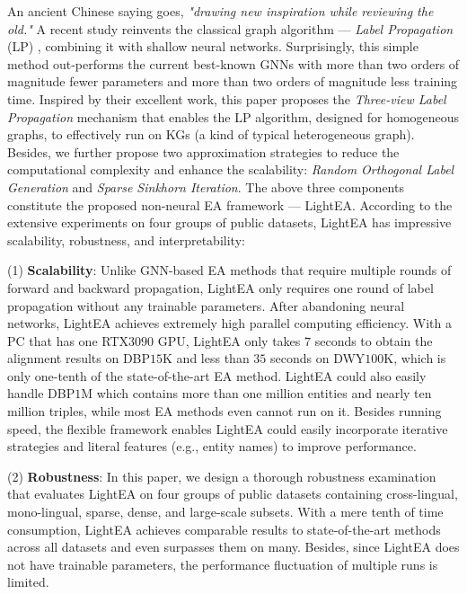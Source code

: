 \documentclass[11pt]{article}
\begin{document}
An ancient Chinese saying goes, \emph{"drawing new inspiration while reviewing the old."}
A recent study \cite{DBLP:conf/iclr/HuangHSLB21} reinvents the classical graph algorithm --- \emph{Label Propagation} (LP) \cite{Zhu2002LearningFL}, combining it with shallow neural networks.
Surprisingly, this simple method out-performs the current best-known GNNs with more than two orders of magnitude fewer parameters and more than two orders of magnitude less training time.
Inspired by their excellent work, this paper proposes the \emph{Three-view Label Propagation} mechanism that enables the LP algorithm, designed for homogeneous graphs, to effectively run on KGs (a kind of typical heterogeneous graph).
Besides, we further propose two approximation strategies to reduce the computational complexity and enhance the scalability:
\emph{Random Orthogonal Label Generation} and \emph{Sparse Sinkhorn Iteration}.
The above three components constitute the proposed non-neural EA framework --- LightEA.
According to the extensive experiments on four groups of public datasets, LightEA has impressive scalability, robustness, and interpretability:

(1) \textbf{Scalability}:
Unlike GNN-based EA methods that require multiple rounds of forward and backward propagation, LightEA only requires one round of label propagation without any trainable parameters.
After abandoning neural networks, LightEA achieves extremely high parallel computing efficiency.
With a PC that has one RTX$3090$ GPU, LightEA only takes $7$ seconds to obtain the alignment results on DBP$15$K and less than $35$ seconds on DWY$100$K, which is only one-tenth of the state-of-the-art EA method.
LightEA could also easily handle DBP$1$M which contains more than one million entities and nearly ten million triples, while most EA methods even cannot run on it.
Besides running speed, the flexible framework enables LightEA could easily incorporate iterative strategies and literal features (e.g., entity names) to improve performance.

(2) \textbf{Robustness}:
In this paper, we design a thorough robustness examination that evaluates LightEA on four groups of public datasets containing cross-lingual, mono-lingual, sparse, dense, and large-scale subsets.
With a mere tenth of time consumption, LightEA achieves comparable results to state-of-the-art methods across all datasets and even surpasses them on many.
Besides, since LightEA does not have trainable parameters, the performance fluctuation of multiple runs is limited.
\end{document}
